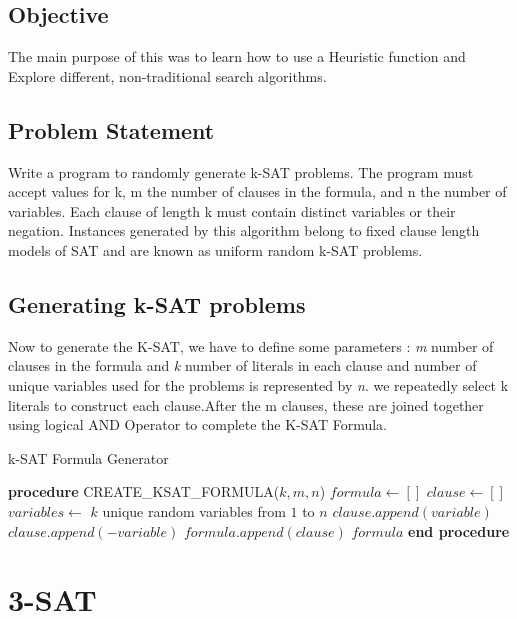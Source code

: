 \documentclass[conference]{IEEEtran}
\begin{document}
\subsection{Objective}

The main purpose of this was to learn how to use a Heuristic function and Explore different, non-traditional search algorithms.

\subsection{Problem Statement}
Write a program to randomly generate k-SAT problems.  The program must accept values for k, m the number of clauses in the formula, and n the number of variables.  Each clause of length k must contain distinct variables or their negation.  Instances generated by this algorithm belong to fixed clause length models of SAT and are known as uniform random k-SAT problems.

    \subsection{Generating k-SAT problems}
Now to generate the K-SAT, we have to define some parameters : \textit{m} number of clauses in the formula and \textit{k} number of literals in each clause and number of unique variables used for the problems is represented by \textit{n}. we repeatedly select k literals to construct each clause.After the m clauses, these are joined together using logical AND Operator to complete the K-SAT Formula. \\
\begin{algorithm}
\caption{k-SAT Formula Generator}
\begin{algorithmic}[1]
\STATE \textbf{procedure} CREATE\_KSAT\_FORMULA($k, m, n$)
\STATE $formula \leftarrow []$
    \STATE $clause \leftarrow []$
    \STATE $variables \leftarrow$ $k$ unique random variables from $1$ to $n$
            \STATE $clause.append(variable)$
        \ELSE
            \STATE $clause.append(-variable)$
        \ENDIF
    \ENDFOR
    \STATE $formula.append(clause)$
\ENDFOR
\RETURN $formula$
\STATE \textbf{end procedure}
\end{algorithmic}
\end{algorithm}

\newpage
\section{3-SAT}
\end{document}
